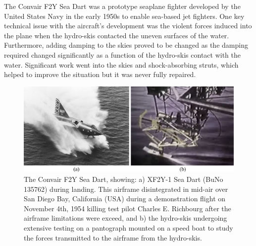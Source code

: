 \documentclass[12pt,letter]{article}
\numberwithin{ex}{section} %
\numberwithin{re}{section} %
\newtheorem{vcs}{Vibration Case Study}
\numberwithin{vcs}{section} %
\newenvironment{vibration_case_study}{\begin{mdframed}[linecolor=orange,middlelinewidth=2mm,roundcorner=20pt]\begin{vcs}\normalfont}{\end{vcs}\end{mdframed}}
\begin{document}
				\begin{vibration_case_study}
					The Convair F2Y Sea Dart was a prototype seaplane fighter developed by the United States Navy in the early 1950s to enable sea-based jet fighters. One key technical issue with the aircraft's development was the violent forces induced into the plane when the hydro-skis contacted the uneven surfaces of the water. Furthermore, adding damping to the skies proved to be changed as the damping required changed significantly as a function of the hydro-skis contact with the water. Significant work went into the skies and shock-absorbing struts, which helped to improve the situation but it was never fully repaired.
					
					
					\begin{figure}[H]
						\centering
						\includegraphics[width=6.0in]{../figures/Convair_F2Y_SeaDart}
						\caption{The  Convair F2Y Sea Dart, showing: a) XF2Y-1 Sea Dart (BuNo 135762) during landing. This airframe disintegrated in mid-air over San Diego Bay, California (USA) during a demonstration flight on November 4th, 1954 killing test pilot Charles E. Richbourg after the airframe limitations were exceed\protect\footnotemark[1], and b) the hydro-skis undergoing extensive testing on a pantograph mounted on a speed boat to study the forces transmitted to the airframe from the hydro-skis\protect\footnotemark[2].}
					\end{figure}
				\end{vibration_case_study}
			
\end{document}
